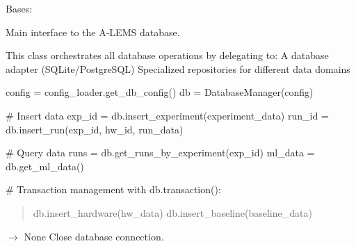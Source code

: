 \documentclass[letterpaper,10pt,english]{sphinxmanual}
\begin{document}
\begin{fulllineitems}
\label{\detokenize{core.database.manager:core.database.manager.DatabaseManager}}
\pysigstartsignatures
\pysiglinewithargsret
{}
{}
{}
\pysigstopsignatures
\sphinxAtStartPar
Bases: 

\sphinxAtStartPar
Main interface to the A‑LEMS database.

\sphinxAtStartPar
This class orchestrates all database operations by delegating to:
\sphinxhyphen{} A database adapter (SQLite/PostgreSQL)
\sphinxhyphen{} Specialized repositories for different data domains
\begin{description}
\sphinxAtStartPar
config = config\_loader.get\_db\_config()
db = DatabaseManager(config)

\sphinxAtStartPar
\# Insert data
exp\_id = db.insert\_experiment(experiment\_data)
run\_id = db.insert\_run(exp\_id, hw\_id, run\_data)

\sphinxAtStartPar
\# Query data
runs = db.get\_runs\_by\_experiment(exp\_id)
ml\_data = db.get\_ml\_data()

\sphinxAtStartPar
\# Transaction management
with db.transaction():
\begin{quote}

\sphinxAtStartPar
db.insert\_hardware(hw\_data)
db.insert\_baseline(baseline\_data)
\end{quote}

\end{description}

\begin{fulllineitems}
\label{\detokenize{core.database.manager:core.database.manager.DatabaseManager.close}}
\pysigstartsignatures
\pysiglinewithargsret
{}
{}
{{ $\rightarrow$ None}}
\pysigstopsignatures
\sphinxAtStartPar
Close database connection.

\end{fulllineitems}



\end{fulllineitems}
\end{document}
